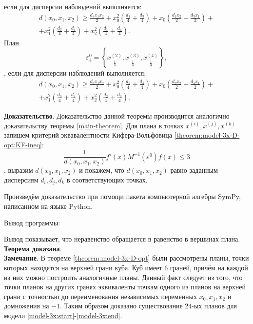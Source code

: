 \begin{theorem}
		если для дисперсии наблюдений выполняется:
		\begin{multline}\label{theorem:model-3x-D-opt:plan-3-d}
			d(x_0, x_1, x_2) \ge \frac{d_{4} x_{1} x_{2}}{2} + x_{0}^{2} \left(\frac{d_{1}}{4} + \frac{d_{3}}{4}\right) + x_{0} \left(\frac{d_{1} x_{2}}{2} - \frac{d_{3} x_{1}}{2}\right) + \\ + x_{1}^{2} \left(\frac{d_{3}}{4} + \frac{d_{4}}{4}\right) + x_{2}^{2} \left(\frac{d_{1}}{4} + \frac{d_{4}}{4}\right).
		\end{multline}
		План 
		\begin{equation} \label{theorem:model-3x-D-opt:plan-4}
			\varepsilon_4^{0} = \left \{ 
				\underset{\frac 1 3} {x^{(2)}},
				\underset{\frac 1 3} {x^{(3)}},
				\underset{\frac 1 3} {x^{(4)}}
			\right \},
		\end{equation},
		если для дисперсии наблюдений выполняется:
		\begin{multline}\label{theorem:model-3x-D-opt:plan-4-d}
			d(x_0, x_1, x_2) \ge \frac{d_{3} x_{1} x_{2}}{2} + x_{0}^{2} \left(\frac{d_{2}}{4} + \frac{d_{4}}{4}\right) + x_{0} \left(\frac{d_{2} x_{2}}{2} + \frac{d_{4} x_{1}}{2}\right) + \\ + x_{1}^{2} \left(\frac{d_{3}}{4} + \frac{d_{4}}{4}\right) + x_{2}^{2} \left(\frac{d_{2}}{4} + \frac{d_{3}}{4}\right).
		\end{multline}		
	\end{theorem}
	
	\textbf{Доказательство}. Доказательство данной теоремы производится аналогично доказательству теоремы \ref{main-theorem}. Для плана в точках $x^{(i)}, x^{(j)}, x^{(k)}$ запишем критерий эквавалентности Кифера-Вольфовица \eqref{theorem:model-3x-D-opt:KF-ineq}:
	\begin{equation}\label{theorem:model-3x-D-opt:KF-ineq}
		\frac{1}{d(x_0, x_1, x_2)} f'(x) M^{-1}(\varepsilon^0) f(x) \le 3
	\end{equation},
	выразим $d(x_0, x_1, x_2)$ и покажем, что $d(x_0, x_1, x_2)$ равно заданным дисперсиям $d_i, d_j, d_k$ в соответствующих точках.
	
	Произведём доказательство при помощи пакета компьютерной алгебры SymPy, написанном на языке Python.
	
	Вывод программы:
	
	Вывод показывает, что неравенство обращается в равенство в вершинах плана. \textbf{Теорема доказана}.\\
	
	\textbf{Замечание}.
	В теореме \ref{theorem:model-3x-D-opt} были рассмотрены планы, точки которых находятся на верхней грани куба. Куб имеет 6 граней, причём на каждой из них можно построить аналогичные планы. Данный факт следует из того, что точки планов на других гранях эквиваленты точкам одного из планов на верхней грани с точностью до переименования независимых переменных $x_0, x_1, x_2$ и домножения на $-1$. Таким образом доказано существование $24$-ых планов для модели \eqref{model-3x:start}-\eqref{model-3x:end}.	
	
	
	
	